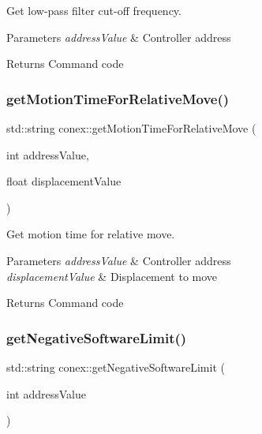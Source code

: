 Get low-\/pass filter cut-\/off frequency. 


\begin{DoxyParams}{Parameters}
{\em address\+Value} & Controller address \\
\hline
\end{DoxyParams}
\begin{DoxyReturn}{Returns}
Command code 
\end{DoxyReturn}
\mbox{\label{namespaceconex_aab2d3f712ba59df6e3001ea727d3c514}} 
\subsubsection{\texorpdfstring{get\+Motion\+Time\+For\+Relative\+Move()}{getMotionTimeForRelativeMove()}}
{\footnotesize\ttfamily std\+::string conex\+::get\+Motion\+Time\+For\+Relative\+Move (\begin{DoxyParamCaption}\item[{int}]{address\+Value,  }\item[{float}]{displacement\+Value }\end{DoxyParamCaption})}



Get motion time for relative move. 


\begin{DoxyParams}{Parameters}
{\em address\+Value} & Controller address \\
\hline
{\em displacement\+Value} & Displacement to move \\
\hline
\end{DoxyParams}
\begin{DoxyReturn}{Returns}
Command code 
\end{DoxyReturn}
\mbox{\label{namespaceconex_a90e63f39f299603adfbab034098ae702}} 
\subsubsection{\texorpdfstring{get\+Negative\+Software\+Limit()}{getNegativeSoftwareLimit()}}
{\footnotesize\ttfamily std\+::string conex\+::get\+Negative\+Software\+Limit (\begin{DoxyParamCaption}\item[{int}]{address\+Value }\end{DoxyParamCaption})}



